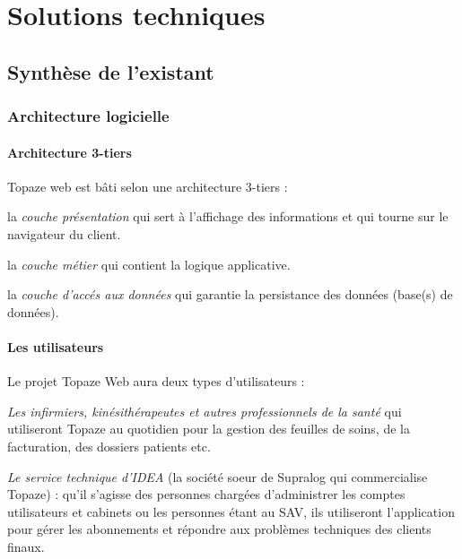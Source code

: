 \newpage
\section{Solutions techniques} %




\subsection{Synthèse de l'existant} %
\subsubsection{Architecture logicielle}
\label{sec:architecture}
\paragraph*{Architecture 3-tiers\\}
Topaze web est bâti selon une architecture 3-tiers : 
\begin{sitemize}
\item la \textit{couche présentation} qui sert à l'affichage des informations et qui tourne sur le navigateur du client.
\item la \textit{couche métier} qui contient la logique applicative.
\item la \textit{couche d'accés aux données} qui garantie la persistance des données (base(s) de données). 
\end{sitemize}

\paragraph*{Les utilisateurs\\}
Le projet Topaze Web aura deux types d'utilisateurs : 
\begin{sitemize}
\item \textit{Les infirmiers, kinésithérapeutes et autres professionnels de la santé} qui utiliseront Topaze au quotidien pour la gestion des feuilles de soins, de la facturation, des dossiers patients etc. 
\item \textit{Le service technique d'IDEA} (la société soeur de Supralog qui commercialise Topaze) : qu’il s’agisse des personnes
chargées d’administrer les comptes utilisateurs et cabinets ou les personnes étant au SAV, ils
utiliseront l’application pour gérer les abonnements et répondre aux problèmes techniques des
clients finaux.
\end{sitemize}


